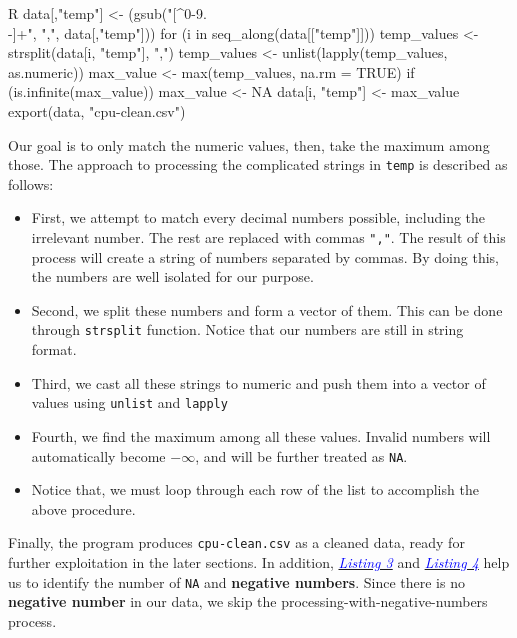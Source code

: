 \begin{code}{R}
data[,"temp"] <- (gsub("[^0-9.\\-]+", ",", data[,"temp"]))
for (i in seq_along(data[["temp"]])) {
    temp_values <- strsplit(data[i, "temp"], ",") 
    temp_values <- unlist(lapply(temp_values, as.numeric))
    max_value <- max(temp_values, na.rm = TRUE)
    if (is.infinite(max_value)) {
        max_value <- NA
    }
    data[i, "temp"] <- max_value
}
export(data, "cpu-clean.csv")
\end{code}

Our goal is to only match the numeric values, then, take the maximum among those. The approach to processing the complicated strings in \verb|temp| is described as follows:
\begin{itemize}
    \item First, we attempt to match every decimal numbers possible, including the irrelevant number. The rest are replaced with commas \verb|","|.
    The result of this process will create a string of numbers separated by commas. By doing this, the numbers are well isolated for our purpose.

    \item Second, we split these numbers and form a vector of them. This can be done through \texttt{strsplit} function. Notice that our numbers
    are still in string format.

    \item Third, we cast all these strings to numeric and push them into a vector of values using \texttt{unlist} and \texttt{lapply}
    
    \item Fourth, we find the maximum among all these values. Invalid numbers will automatically become \(-\infty\), and will be further treated as \texttt{NA}.
    
    \item Notice that, we must loop through each row of the list to accomplish the above procedure.
\end{itemize}

Finally, the program produces \verb|cpu-clean.csv| as a cleaned data, ready for further exploitation in the later sections. In addition, \hyperlink{Listing 3}{\textit{\textcolor{blue}{Listing 3}}} and \hyperlink{Listing 4}{\textit{\textcolor{blue}{Listing 4}}} help us to identify the number of \texttt{NA} and \textbf{negative numbers}. Since there is no  \textbf{negative number} in our data, we skip the processing-with-negative-numbers process.

